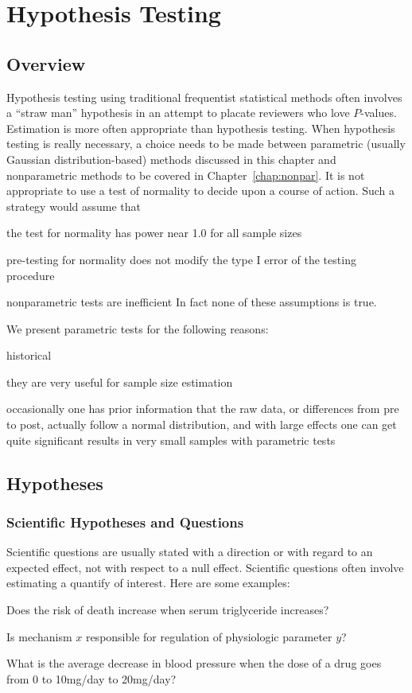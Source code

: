 
\chapter{Hypothesis Testing}
\section{Overview}
Hypothesis testing using traditional frequentist statistical methods
often involves a ``straw man'' hypothesis in an 
attempt to placate reviewers who love $P$-values.  Estimation is more
often appropriate than hypothesis testing.  When hypothesis testing is
really necessary, a choice needs to be made between parametric
(usually Gaussian distribution-based) methods discussed in this
chapter and nonparametric methods to be covered in
Chapter~\ref{chap:nonpar}.  It is not appropriate to use a test of
normality to decide upon a course of action.  Such a strategy would
assume that
\be
\item the test for normality has power near 1.0 for all sample sizes
\item pre-testing for normality does not modify the type I error of
  the testing procedure
\item nonparametric tests are inefficient
\ee
In fact none of these assumptions is true.

We present parametric tests for the following reasons:
\be
\item historical
\item they are very useful for sample size estimation
\item occasionally one has prior information that the raw data, or
  differences from pre to post, actually follow a normal distribution,
  and with large effects one can get quite significant results in very
  small samples with parametric tests
\ee

\section{Hypotheses}
\subsection{Scientific Hypotheses and Questions}
Scientific questions are usually stated with a direction or with
regard to an expected effect, not with respect to a null effect.
Scientific questions often involve estimating a quantify of interest.
Here are some examples:
\bi
\item Does the risk of death increase when serum triglyceride
  increases?
\item Is mechanism $x$ responsible for regulation of physiologic
  parameter $y$?
\item What is the average decrease in blood pressure when the dose of
  a drug goes from 0 to 10mg/day to 20mg/day?
\ei
